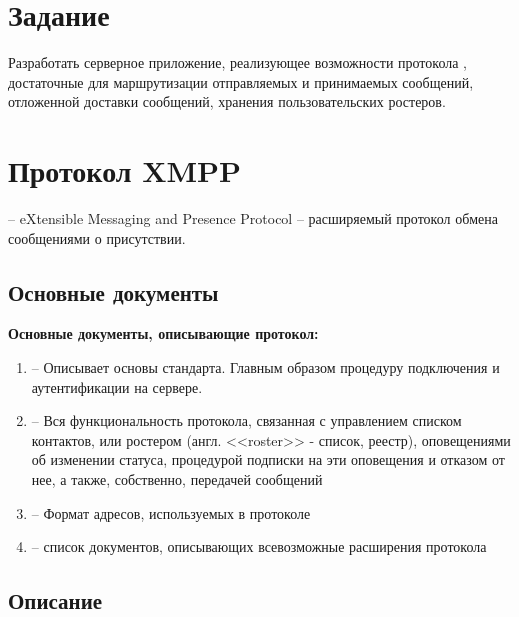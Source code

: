





\tableofcontents
\newpage

\section{Задание}

Разработать серверное приложение, реализующее возможности протокола , достаточные для маршрутизации отправляемых и принимаемых сообщений, отложенной доставки сообщений, хранения пользовательских ростеров.

\section{Протокол XMPP}

 -- eXtensible Messaging and Presence Protocol -- расширяемый протокол обмена сообщениями о присутствии.\\

\subsection{Основные документы}

\textbf{Основные документы, описывающие протокол:}

\begin{enumerate}
	\item \href{https://xmpp.org/rfcs/rfc6120.html}{} -- Описывает основы стандарта. Главным образом процедуру подключения и аутентификации на сервере.
	\item \href{https://xmpp.org/rfcs/rfc6121.html}{} -- Вся функциональность протокола, связанная с управлением списком контактов, или ростером (англ. <<roster>> - список, реестр), оповещениями об изменении статуса, процедурой подписки на эти оповещения и отказом от нее, а также, собственно, передачей сообщений
	\item \href{https://xmpp.org/rfcs/rfc6122.html}{} -- Формат адресов, используемых в протоколе
	\item \href{https://xmpp.org/extensions/}{} -- список документов, описывающих всевозможные расширения протокола
\end{enumerate}

\subsection{Описание}

